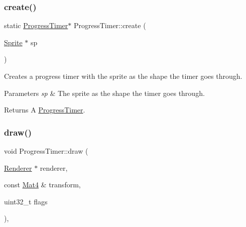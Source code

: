 \subsubsection{\texorpdfstring{create()}{create()}\hspace{0.1cm}{\footnotesize\ttfamily [2/2]}}
{\footnotesize\ttfamily static \hyperlink{classProgressTimer}{Progress\+Timer}$\ast$ Progress\+Timer\+::create (\begin{DoxyParamCaption}\item[{\hyperlink{classSprite}{Sprite} $\ast$}]{sp }\end{DoxyParamCaption})\hspace{0.3cm}{\ttfamily [static]}}

Creates a progress timer with the sprite as the shape the timer goes through.


\begin{DoxyParams}{Parameters}
{\em sp} & The sprite as the shape the timer goes through. \\
\hline
\end{DoxyParams}
\begin{DoxyReturn}{Returns}
A \hyperlink{classProgressTimer}{Progress\+Timer}. 
\end{DoxyReturn}
\mbox{\label{classProgressTimer_aeff75c55be12ed0c7cc8893140c78de6}} 
\subsubsection{\texorpdfstring{draw()}{draw()}\hspace{0.1cm}{\footnotesize\ttfamily [1/2]}}
{\footnotesize\ttfamily void Progress\+Timer\+::draw (\begin{DoxyParamCaption}\item[{\hyperlink{classRenderer}{Renderer} $\ast$}]{renderer,  }\item[{const \hyperlink{classMat4}{Mat4} \&}]{transform,  }\item[{uint32\+\_\+t}]{flags }\end{DoxyParamCaption})\hspace{0.3cm}{\ttfamily [override]}, {\ttfamily [virtual]}}

